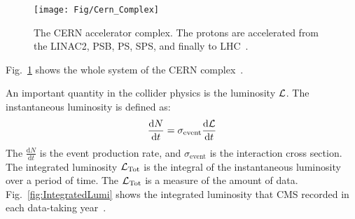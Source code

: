 \begin{figure}[!ht]
  \begin{center}
    \texttt{[image: Fig/Cern\_Complex]}\\
    \caption{The CERN accelerator complex. The protons are accelerated from the LINAC2, PSB, PS, SPS, and finally to LHC~\cite{Mobs:2197559}.}
    \label{fig:cerncomp}
  \end{center}
\end{figure}

Fig.~\ref{fig:cerncomp} shows the whole system of the CERN complex~\cite{Mobs:2197559}. 

An important quantity in the collider physics is the luminosity $\mathcal{L}$. The instantaneous luminosity is defined as:
\begin{equation}
	\frac{\mathrm d N}{\mathrm d t}=\sigma_{\text{event}}\frac{\mathrm d \mathcal{L}}{\mathrm d t}
\end{equation}
The $\frac{\mathrm d N}{\mathrm d t}$ is the event production rate, and $\sigma_{\text{event}}$ is the interaction cross section.
The integrated luminosity $\mathcal{L}_{\text{Tot}}$ is the integral of the instantaneous luminosity over a period of time. The $\mathcal{L}_{\text{Tot}}$ is a measure of the amount of data. Fig.~\ref{fig:IntegratedLumi} shows the integrated luminosity that CMS recorded in each data-taking year~\cite{CMSLUMI}. 

